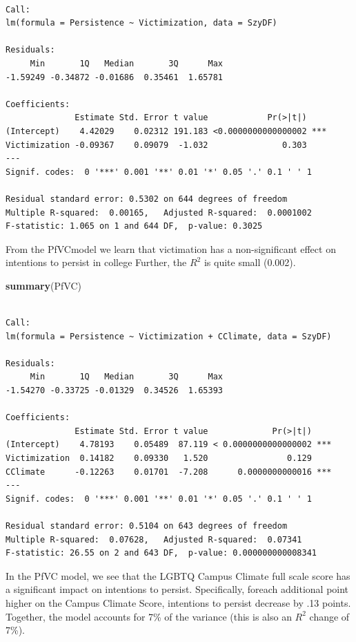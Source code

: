 \documentclass[
  english,
]{book}
\newenvironment{Shaded}{\begin{snugshade}}{\end{snugshade}}
\newcommand{\KeywordTok}[1]{\textcolor[rgb]{0.13,0.29,0.53}{\textbf{#1}}}
\newcommand{\NormalTok}[1]{#1}
\begin{document}
\begin{verbatim}

Call:
lm(formula = Persistence ~ Victimization, data = SzyDF)

Residuals:
     Min       1Q   Median       3Q      Max 
-1.59249 -0.34872 -0.01686  0.35461  1.65781 

Coefficients:
              Estimate Std. Error t value            Pr(>|t|)    
(Intercept)    4.42029    0.02312 191.183 <0.0000000000000002 ***
Victimization -0.09367    0.09079  -1.032               0.303    
---
Signif. codes:  0 '***' 0.001 '**' 0.01 '*' 0.05 '.' 0.1 ' ' 1

Residual standard error: 0.5302 on 644 degrees of freedom
Multiple R-squared:  0.00165,   Adjusted R-squared:  0.0001002 
F-statistic: 1.065 on 1 and 644 DF,  p-value: 0.3025
\end{verbatim}

From the PfVCmodel we learn that victimation has a non-significant effect on intentions to persist in college Further, the \(R^2\) is quite small (0.002).

\begin{Shaded}
\begin{Highlighting}[]
\KeywordTok{summary}\NormalTok{(PfVC)}
\end{Highlighting}
\end{Shaded}

\begin{verbatim}

Call:
lm(formula = Persistence ~ Victimization + CClimate, data = SzyDF)

Residuals:
     Min       1Q   Median       3Q      Max 
-1.54270 -0.33725 -0.01329  0.34526  1.65393 

Coefficients:
              Estimate Std. Error t value             Pr(>|t|)    
(Intercept)    4.78193    0.05489  87.119 < 0.0000000000000002 ***
Victimization  0.14182    0.09330   1.520                0.129    
CClimate      -0.12263    0.01701  -7.208      0.0000000000016 ***
---
Signif. codes:  0 '***' 0.001 '**' 0.01 '*' 0.05 '.' 0.1 ' ' 1

Residual standard error: 0.5104 on 643 degrees of freedom
Multiple R-squared:  0.07628,   Adjusted R-squared:  0.07341 
F-statistic: 26.55 on 2 and 643 DF,  p-value: 0.000000000008341
\end{verbatim}

In the PfVC model, we see that the LGBTQ Campus Climate full scale score has a significant impact on intentions to persist. Specifically, foreach additional point higher on the Campus Climate Score, intentions to persist decrease by .13 points. Together, the model accounts for 7\% of the variance (this is also an \(R^2\) change of 7\%).
\end{document}
